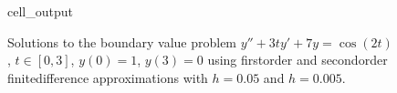 \documentclass[letterpaper,10pt,english]{jupyterBook}
\begin{document}
\begin{figure}[htbp]
\centering
\capstart
\begin{sphinxVerbatimOutput}

\begin{sphinxuseclass}{cell_output}
\noindent{}

\end{sphinxuseclass}\end{sphinxVerbatimOutput}
\caption{Solutions to the boundary value problem \(y'' + 3ty' + 7y = \cos (2t)\), \(t \in [0,3]\), \(y(0) = 1\), \(y(3) = 0\) using first\sphinxhyphen{}order and second\sphinxhyphen{}order finite\sphinxhyphen{}difference approximations with \(h=0.05\) and \(h=0.005\).}\label{\detokenize{5_BVPs/5.2_Finite_difference_method:bvp-fdm-accuracy-figure-2}}\end{figure}

\sphinxstepscope
\end{document}
